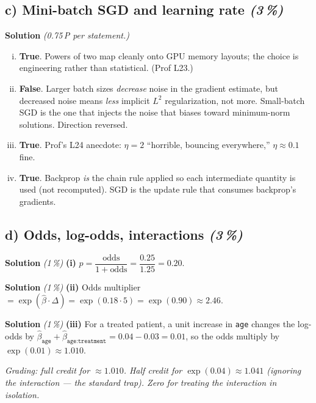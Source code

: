 \documentclass[11pt,a4paper]{article}
\newcommand{\subpoints}[1]{\textit{(#1\,\%)}}
\newcommand{\sol}{\noindent\textbf{Solution}}
\begin{document}
\subsection*{c) Mini-batch SGD and learning rate \subpoints{3}}
\sol{} \emph{(0.75\,P per statement.)}
\begin{enumerate}[(i)]
  \item \textbf{True}. Powers of two map cleanly onto GPU memory layouts; the choice is engineering
        rather than statistical. (Prof L23.)
  \item \textbf{False}. Larger batch sizes \emph{decrease} noise in the gradient estimate, but
        decreased noise means \emph{less} implicit $L^2$ regularization, not more. Small-batch SGD
        is the one that injects the noise that biases toward minimum-norm solutions. Direction
        reversed.
  \item \textbf{True}. Prof's L24 anecdote: $\eta=2$ ``horrible, bouncing everywhere,''
        $\eta\approx 0.1$ fine.
  \item \textbf{True}. Backprop \emph{is} the chain rule applied so each intermediate quantity is
        used (not recomputed). SGD is the update rule that consumes backprop's gradients.
\end{enumerate}

\subsection*{d) Odds, log-odds, interactions \subpoints{3}}

\sol{} \subpoints{1} \textbf{(i)} $p=\dfrac{\text{odds}}{1+\text{odds}}=\dfrac{0.25}{1.25}=\boxed{0.20}$.

\medskip
\sol{} \subpoints{1} \textbf{(ii)} Odds multiplier $=\exp(\hat\beta\cdot\Delta)=\exp(0.18\cdot 5)
=\exp(0.90)\approx \boxed{2.46}$.

\medskip
\sol{} \subpoints{1} \textbf{(iii)} For a treated patient, a unit increase in \texttt{age}
changes the log-odds by $\hat\beta_{\texttt{age}}+\hat\beta_{\texttt{age:treatment}}=0.04-0.03=0.01$,
so the odds multiply by $\exp(0.01)\approx \boxed{1.010}$.

\noindent\emph{Grading: full credit for $\approx 1.010$. Half credit for $\exp(0.04)\approx 1.041$
(ignoring the interaction --- the standard trap). Zero for treating the interaction in isolation.}
\end{document}
